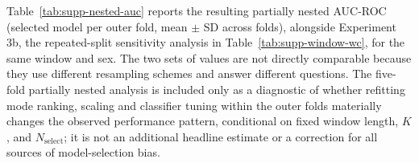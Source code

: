 \documentclass[preprint,12pt]{elsarticle}
\begin{document}
\begin{table}[H]
\centering
\begin{minipage}{0.8\linewidth}
\captionsetup{justification=raggedright, singlelinecheck=false}
\caption{Gaussian-kernel mode set obtained independently in each of five stratified outer folds of
the partially nested cross-validation, by window duration and sex. The ``Stable'' column refers
only to agreement across the five outer folds, not to agreement with the mode set used in the
reported pipeline.}
\label{tab:supp-nested-modes}
\end{minipage}
\end{table}

Table~\ref{tab:supp-nested-auc} reports the resulting partially nested AUC-ROC (selected model per
outer fold, mean $\pm$ SD across folds), alongside Experiment 3b, the repeated-split sensitivity
analysis in Table~\ref{tab:supp-window-wc}, for the same window and sex. The two sets of values
are not directly comparable because they use different resampling schemes and answer different
questions. The five-fold partially nested analysis is included only as a diagnostic of whether
refitting mode ranking, scaling and classifier tuning within the outer folds materially changes
the observed performance pattern, conditional on fixed window length, $K$, and
$N_{\text{select}}$; it is not an additional headline estimate or a correction for all sources
of model-selection bias.
\end{document}
